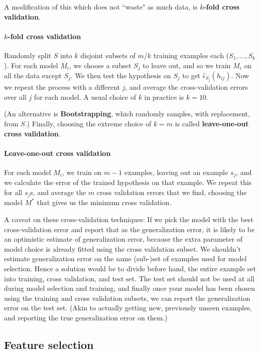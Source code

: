 \documentclass[letterpaper,10pt]{article}
\begin{document}
A modification of this which does not ``waste" as much data, is $k$\textbf{-fold cross validation}.

\paragraph{$k$-fold cross validation} Randomly split $S$ into $k$ disjoint subsets of $m/k$ training examples each ($S_1,\ldots,S_k$). For each model $M_i$, we choose a subset $S_j$ to leave out, and so we train $M_i$ on all the data except $S_j$. We then test the hypothesis on $S_j$ to get $\hat \epsilon_{S_j} (h_{ij})$. Now we repeat the process with a different $j$, and average the cross-validation errors over all $j$ for each model. A usual choice of $k$ in practice is $k=10$.

(An alternative is \textbf{Bootstrapping}, which randomly samples, with replacement, from $S$.) Finally, choosing the extreme choice of $k=m$ is called \textbf{leave-one-out cross validation}.

\paragraph{Leave-one-out cross validation} For each model $M_i$, we train on $m-1$ examples, leaving out an example $s_j$, and we calculate the error of the trained hypothesis on that example. We repeat this for all $s_j$s, and average the $m$ cross validation errors that we find, choosing the model $M^*$ that gives us the minimum cross validation.


A caveat on these cross-validation techniques: If we pick the model with the best cross-validation error and report that as the generalization error, it is likely to be an optimistic estimate of generalization error, because the extra parameter of model choice is already fitted using the cross validation subset. We shouldn't estimate generalization error on the same (sub-)set of examples used for model selection. Hence a solution would be to divide before hand, the entire example set into training, cross validation, and test set. The test set should not be used at all during model selection and training, and finally once your model has been chosen using the training and cross validation subsets, we can report the generalization error on the test set. (Akin to actually getting new, previously unseen examples, and reporting the true generalization error on them.)




\subsection{Feature selection}
\end{document}

